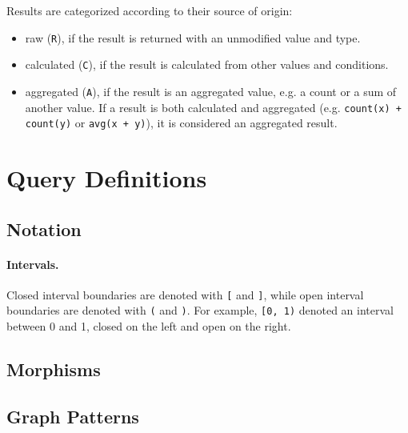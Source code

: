 
Results are categorized according to their source of origin:

\begin{itemize}
	\item raw (\texttt{R}), if the result is returned with an unmodified value and type.
	\item calculated (\texttt{C}), if the result is calculated from other values and conditions.
	\item aggregated (\texttt{A}), if the result is an aggregated value, e.g. a count or a sum of another value. If a result is both calculated and aggregated (e.g. \texttt{count(x) + count(y)} or \texttt{avg(x + y)}), it is considered an aggregated result.
\end{itemize}




\section{Query Definitions}

\subsection{Notation}

\paragraph{Intervals.} Closed interval boundaries are denoted with \texttt{[} and \texttt{]}, while open interval boundaries are denoted with \texttt{(} and \texttt{)}. For example, \texttt{[0, 1)} denoted an interval between 0 and 1, closed on the left and open on the right.

\subsection{Morphisms}


\subsection{Graph Patterns}

